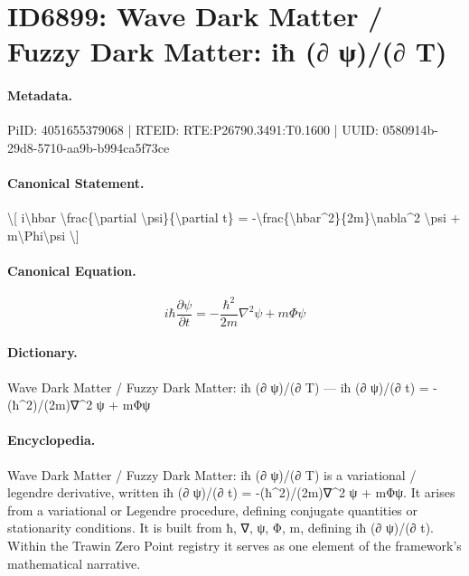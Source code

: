 \section*{ID6899: Wave Dark Matter / Fuzzy Dark Matter: iħ (∂ ψ)/(∂ T)}
\paragraph{Metadata.}
PiID: 4051655379068 | RTEID: RTE:P26790.3491:T0.1600 | UUID: 0580914b-29d8-5710-aa9b-b994ca5f73ce

\paragraph{Canonical Statement.}
\textbackslash{}[ i\textbackslash{}hbar \textbackslash{}frac\{\textbackslash{}partial \textbackslash{}psi\}\{\textbackslash{}partial t\} = -\textbackslash{}frac\{\textbackslash{}hbar\textasciicircum{}2\}\{2m\}\textbackslash{}nabla\textasciicircum{}2 \textbackslash{}psi + m\textbackslash{}Phi\textbackslash{}psi \textbackslash{}]

\paragraph{Canonical Equation.}
\[
i\hbar \frac{\partial \psi}{\partial t} = -\frac{\hbar^2}{2m}\nabla^2 \psi + m\Phi\psi
\]

\paragraph{Dictionary.}
Wave Dark Matter / Fuzzy Dark Matter: iħ (∂ ψ)/(∂ T) — iħ (∂ ψ)/(∂ t) = -(ħ\textasciicircum{}2)/(2m)∇\textasciicircum{}2 ψ + mΦψ

\paragraph{Encyclopedia.}
Wave Dark Matter / Fuzzy Dark Matter: iħ (∂ ψ)/(∂ T) is a variational / legendre derivative, written iħ (∂ ψ)/(∂ t) = -(ħ\textasciicircum{}2)/(2m)∇\textasciicircum{}2 ψ + mΦψ. It arises from a variational or Legendre procedure, defining conjugate quantities or stationarity conditions. It is built from ħ, ∇, ψ, Φ, m, defining iħ (∂ ψ)/(∂ t). Within the Trawin Zero Point registry it serves as one element of the framework's mathematical narrative.
